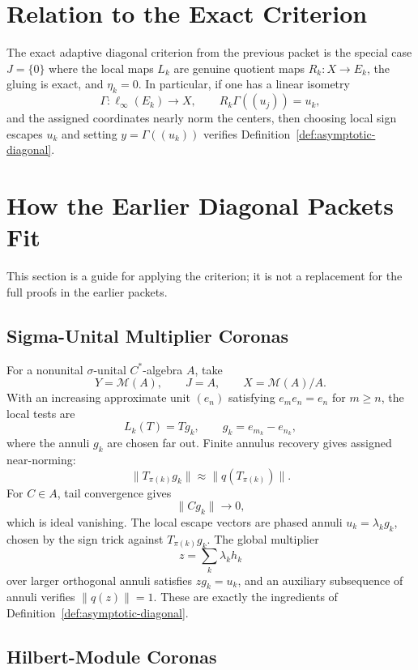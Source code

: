 \documentclass[11pt]{article}
\newcommand{\M}{\mathcal M}
\begin{document}
\section*{Relation to the Exact Criterion}

The exact adaptive diagonal criterion from the previous packet is the special
case \(J=\{0\}\) where the local maps \(L_k\) are genuine quotient maps
\(R_k:X\to E_k\), the gluing is exact, and \(\eta_k=0\).  In particular, if
one has a linear isometry
\[
        \Gamma:\ell_\infty(E_k)\to X,\qquad R_k\Gamma((u_j))=u_k,
\]
and the assigned coordinates nearly norm the centers, then choosing local
sign escapes \(u_k\) and setting \(y=\Gamma((u_k))\) verifies
Definition~\ref{def:asymptotic-diagonal}.

\section*{How the Earlier Diagonal Packets Fit}

This section is a guide for applying the criterion; it is not a replacement
for the full proofs in the earlier packets.

\subsection*{Sigma-Unital Multiplier Coronas}

For a nonunital \(\sigma\)-unital \(C^*\)-algebra \(A\), take
\[
        Y=\M(A),\qquad J=A,\qquad X=\M(A)/A.
\]
With an increasing approximate unit \((e_n)\) satisfying
\(e_me_n=e_n\) for \(m\ge n\), the local tests are
\[
        L_k(T)=Tg_k,\qquad g_k=e_{m_k}-e_{n_k},
\]
where the annuli \(g_k\) are chosen far out.  Finite annulus recovery gives
assigned near-norming:
\[
        \|T_{\pi(k)}g_k\|\approx \|q(T_{\pi(k)})\|.
\]
For \(C\in A\), tail convergence gives
\[
        \|Cg_k\|\to0,
\]
which is ideal vanishing.  The local escape vectors are phased annuli
\(u_k=\lambda_kg_k\), chosen by the sign trick against
\(T_{\pi(k)}g_k\).  The global multiplier
\[
        z=\sum_k\lambda_kh_k
\]
over larger orthogonal annuli satisfies \(zg_k=u_k\), and an auxiliary
subsequence of annuli verifies \(\|q(z)\|=1\).  These are exactly the
ingredients of Definition~\ref{def:asymptotic-diagonal}.

\subsection*{Hilbert-Module Coronas}
\end{document}
